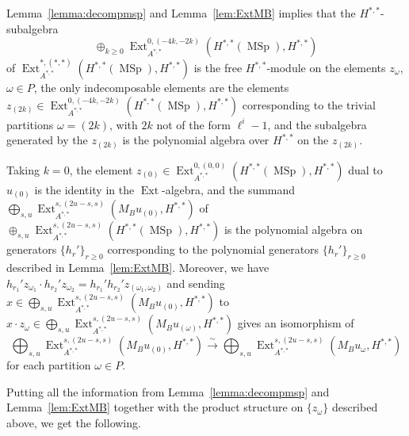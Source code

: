 \documentclass[10pt]{amsart}
\theoremstyle{definition}
\theoremstyle{plain}
\numberwithin{equation}{section}
\newcommand{\0}{\emptyset}
\newcommand{\MSp}{{\operatorname{MSp}}}
\newcommand{\Ext}{{\operatorname{Ext}}}
\begin{document}
 Lemma~\ref{lemma:decompmsp} and Lemma~\ref{lem:ExtMB}  implies that the $H^{*,*}$-subalgebra
 $$\oplus_{k\ge0} \Ext_{A^{*,*}}^{0,(-4k,-2k)}(H^{*,*}(\MSp),H^{*,*})$$
 of $ \Ext_{A^{*,*}}^{*,(*,*)}(H^{*,*}(\MSp),H^{*,*})$ is the free $H^{*,*}$-module on the elements $z_\omega$, $\omega\in P$, the only indecomposable elements are the elements $z_{(2k)}\in \Ext_{A^{*,*}}^{0,(-4k,-2k)}(H^{*,*}(\MSp),H^{*,*})$ corresponding to the trivial partitions $\omega=(2k)$, with $2k$ not of the form $\ell^i-1$, and the subalgebra generated by the 
 $z_{(2k)}$ is the polynomial algebra over $H^{*,*}$ on the $z_{(2k)}$.
  
Taking $k=0$, the element $z_{(0)}\in \Ext_{A^{*,*}}^{0,(0,0)}(H^{*,*}(\MSp),H^{*,*})$ dual to $u_{(0)}$ is the identity in the $\Ext$-algebra,  and the summand
$\bigoplus_{s,u}\Ext_{A^{*,*}}^{s,(2u-s,s)}(M_Bu_{(0)},H^{*,*})$
of $\oplus_{s,u}\Ext_{A^{*,*}}^{s,(2u-s,s)}(H^{*,*}(\MSp),H^{*,*})$ is the polynomial algebra on generators $\{h_r'\}_{r\ge0}$ corresponding to the polynomial generators $\{h_r'\}_{r\ge0}$ described in Lemma~\ref{lem:ExtMB}. Moreover, we have $h_{r_1}'z_{\omega_1}\cdot h_{r_2}'z_{\omega_2}=h_{r_1}'h_{r_2}'z_{(\omega_1,\omega_2)}$ and sending $x\in \bigoplus_{s,u}\Ext_{A^{*,*}}^{s,(2u-s,s)}(M_Bu_{(0)},H^{*,*})$ to $x\cdot z_\omega\in \bigoplus_{s,u}\Ext_{A^{*,*}}^{s,(2u-s,s)}(M_Bu_{(\omega)},H^{*,*})$ gives an isomorphism of $$\bigoplus_{s,u}\Ext_{A^{*,*}}^{s,(2u-s,s)}(M_Bu_{(0)},H^{*,*}) \xrightarrow{\sim}\bigoplus_{s,u}\Ext_{A^{*,*}}^{s,(2u-s,s)}(M_Bu_{\omega},H^{*,*})$$
for each partition $\omega\in P$.
  
 Putting all the information from Lemma~\ref{lemma:decompmsp} and Lemma~\ref{lem:ExtMB} together with the product structure on $\{z_\omega\}$ described above, we get the following.
\end{document}
